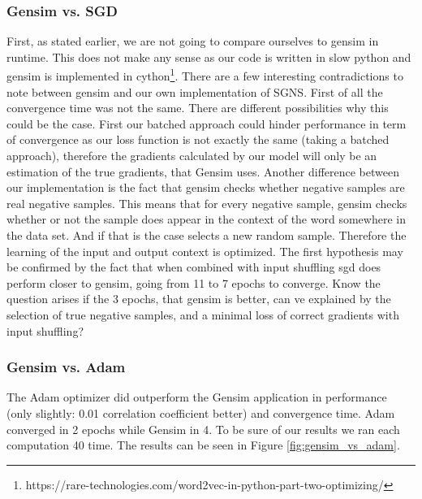 \subsubsection{Gensim vs. SGD}
First, as stated earlier, we are not going to compare ourselves to gensim in runtime. This does not make any sense as our code is written in slow python and gensim is implemented in cython\footnote{https://rare-technologies.com/word2vec-in-python-part-two-optimizing/}. 
There are a few interesting contradictions to note between gensim and our own implementation of SGNS. First of all the convergence time was not the same. There are different possibilities why this could be the case. First our batched approach could hinder performance in term of convergence as our loss function is not exactly the same (taking a batched approach), therefore the gradients calculated by our model will only be an estimation of the true gradients, that Gensim uses. Another difference between our implementation is the fact that gensim checks whether negative samples are real negative samples. This means that for every negative sample, gensim checks whether or not the sample does appear in the context of the word somewhere in the data set. And if that is the case selects a new random sample. Therefore the learning of the input and output context is optimized. 
The first hypothesis may be confirmed by the fact that when combined with input shuffling sgd does perform closer to gensim, going from 11 to 7 epochs to converge. Know the question arises if the 3 epochs, that gensim is better, can ve explained by the selection of true negative samples, and a minimal loss of correct gradients with input shuffling?

\subsubsection{Gensim vs. Adam}
The Adam optimizer did outperform the Gensim application in performance (only slightly: 0.01 correlation coefficient better) and convergence time. Adam converged in 2 epochs while Gensim in 4. To be sure of our results we ran each computation 40 time. The results can be  seen in Figure \ref{fig:gensim_vs_adam}.

